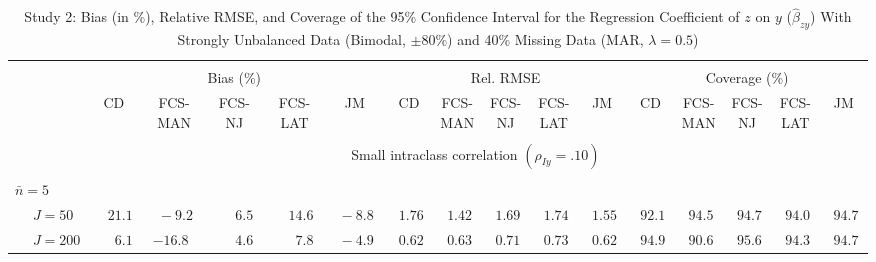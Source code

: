 \begin{sidewaystable}
\begin{threeparttable}
\setlength{\tabcolsep}{1.0pt}
\renewcommand{\arraystretch}{0.95}
\footnotesize
\caption{\small Study 2: Bias (in \%), Relative RMSE, and Coverage of the 95\% Confidence Interval for the Regression Coefficient of $z$ on $y$ ($\hat\beta_{zy}$) With Strongly Unbalanced Data (Bimodal, $\pm 80\%$) and 40\% Missing Data (MAR, $\lambda=0.5$)}
\begin{tabular}{llccccccccccccccc}
\hline\\[-1.8ex]
& & \multicolumn{5}{c}{Bias (\%)} & \multicolumn{5}{c}{Rel. RMSE} & \multicolumn{5}{c}{Coverage (\%)} \\ \cmidrule(r){3-7}\cmidrule(r){8-12}\cmidrule(r){13-17}
 &  & CD & \makecell{FCS-\\MAN} & \makecell{FCS-\\NJ} & \makecell{FCS-\\LAT} & JM & CD & \makecell{FCS-\\MAN} & \makecell{FCS-\\NJ} & \makecell{FCS-\\LAT} & JM & CD & \makecell{FCS-\\MAN} & \makecell{FCS-\\NJ} & \makecell{FCS-\\LAT} & \multicolumn{1}{c}{JM} \\ 
[0.4ex]\hline\\[-1.8ex]
& & \multicolumn{15}{c}{Small intraclass correlation $(\rho_{Iy}=.10)$} \\[0.6ex]\hline\\[-1.8ex]
\multicolumn{4}{l}{$\bar{n}=5$} \\  & \nopagebreak $\;J=50$  & $\phantom{-}21.1\phantom{0}$ & $\phantom{0}{-}9.2\phantom{0}$ & $\phantom{0}\phantom{-}6.5\phantom{0}$ & $\phantom{-}14.6\phantom{0}$ & $\phantom{0}{-}8.8\phantom{0}$ & $\phantom{0}1.76\phantom{0}$ & $\phantom{0}1.42\phantom{0}$ & $\phantom{0}1.69\phantom{0}$ & $\phantom{0}1.74\phantom{0}$ & $\phantom{0}1.55\phantom{0}$ & $\phantom{0}92.1\phantom{0}$ & $\phantom{0}94.5\phantom{0}$ & $\phantom{0}94.7\phantom{0}$ & $\phantom{0}94.0\phantom{0}$ & $\phantom{0}94.7\phantom{0}$ \\
 & \nopagebreak $\;J=200$  & $\phantom{0}\phantom{-}6.1\phantom{0}$ & ${-}16.8\phantom{0}$ & $\phantom{0}\phantom{-}4.6\phantom{0}$ & $\phantom{0}\phantom{-}7.8\phantom{0}$ & $\phantom{0}{-}4.9\phantom{0}$ & $\phantom{0}0.62\phantom{0}$ & $\phantom{0}0.63\phantom{0}$ & $\phantom{0}0.71\phantom{0}$ & $\phantom{0}0.73\phantom{0}$ & $\phantom{0}0.62\phantom{0}$ & $\phantom{0}94.9\phantom{0}$ & $\phantom{0}90.6\phantom{0}$ & $\phantom{0}95.6\phantom{0}$ & $\phantom{0}94.3\phantom{0}$ & $\phantom{0}94.7\phantom{0}$ \\

\end{tabular}
\end{threeparttable}
\end{sidewaystable}
